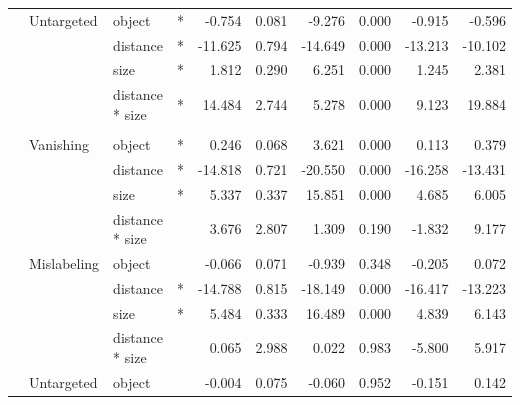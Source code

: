 \documentclass[
]{article}
\begin{document}
\begin{longtable}[t]{llllrrrrrr}
\cmidrule{2-10}\nopagebreak
\hspace{1em} & Untargeted & object & * & -0.754 & 0.081 & -9.276 & 0.000 & -0.915 & -0.596\\
\cmidrule{3-10}\nopagebreak
\hspace{1em} &  & distance & * & -11.625 & 0.794 & -14.649 & 0.000 & -13.213 & -10.102\\
\cmidrule{3-10}\nopagebreak
\hspace{1em} &  & size & * & 1.812 & 0.290 & 6.251 & 0.000 & 1.245 & 2.381\\
\cmidrule{3-10}\nopagebreak
\hspace{1em} &  & distance * size & * & 14.484 & 2.744 & 5.278 & 0.000 & 9.123 & 19.884\\
\cmidrule{1-10}\pagebreak[0]
\addlinespace[0.3em]
\multicolumn{10}{l}{\textbf{SSD}}\\
\hspace{1em} & Vanishing & object & * & 0.246 & 0.068 & 3.621 & 0.000 & 0.113 & 0.379\\
\cmidrule{3-10}\nopagebreak
\hspace{1em} &  & distance & * & -14.818 & 0.721 & -20.550 & 0.000 & -16.258 & -13.431\\
\cmidrule{3-10}\nopagebreak
\hspace{1em} &  & size & * & 5.337 & 0.337 & 15.851 & 0.000 & 4.685 & 6.005\\
\cmidrule{3-10}\nopagebreak
\hspace{1em} &  & distance * size &  & 3.676 & 2.807 & 1.309 & 0.190 & -1.832 & 9.177\\
\cmidrule{2-10}\nopagebreak
\hspace{1em} & Mislabeling & object &  & -0.066 & 0.071 & -0.939 & 0.348 & -0.205 & 0.072\\
\cmidrule{3-10}\nopagebreak
\hspace{1em} &  & distance & * & -14.788 & 0.815 & -18.149 & 0.000 & -16.417 & -13.223\\
\cmidrule{3-10}\nopagebreak
\hspace{1em} &  & size & * & 5.484 & 0.333 & 16.489 & 0.000 & 4.839 & 6.143\\
\cmidrule{3-10}\nopagebreak
\hspace{1em} &  & distance * size &  & 0.065 & 2.988 & 0.022 & 0.983 & -5.800 & 5.917\\
\cmidrule{2-10}\nopagebreak
\hspace{1em} & Untargeted & object &  & -0.004 & 0.075 & -0.060 & 0.952 & -0.151 & 0.142\\

\end{longtable}
\end{document}
